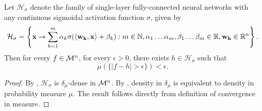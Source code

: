 \begin{corollary}
Let $\mathcal{H}_{\sigma}$ denote the family of single-layer fully-connected neural networks with any continuous sigmoidal activation function $\sigma$, given by \begin{align*}
\mathcal{H}_{\sigma} = \left \{ \mathbf{x} \to \sum_{k=1}^{m} \alpha_k \sigma{\left (\langle \mathbf{w_k}, \mathbf{x} \rangle + \beta_k \right)} : m \in {\mathbb N}, \alpha_1 \ldots \alpha_m, \beta_1 \ldots \beta_m \in {\mathbb R}, \mathbf{w_k} \in {\mathbb R}^n \right \}.
\end{align*}
Then for every $f \in {\mathcal M}^n$, for every $\epsilon > 0$, there exists $h \in \mathcal{H}_\sigma$ such that \[
    \mu (\{ | f - h | > \epsilon \}) < \epsilon.
\]
\end{corollary}
\begin{proof}
By , $\mathcal{H}_{\sigma}$ is $\delta_\mu$-dense in ${\mathcal M}^n$.
By , density in $\delta_\mu$ is equivalent to density in probability measure $\mu$.
The result follows directly from definition of convergence in measure.
\end{proof}

